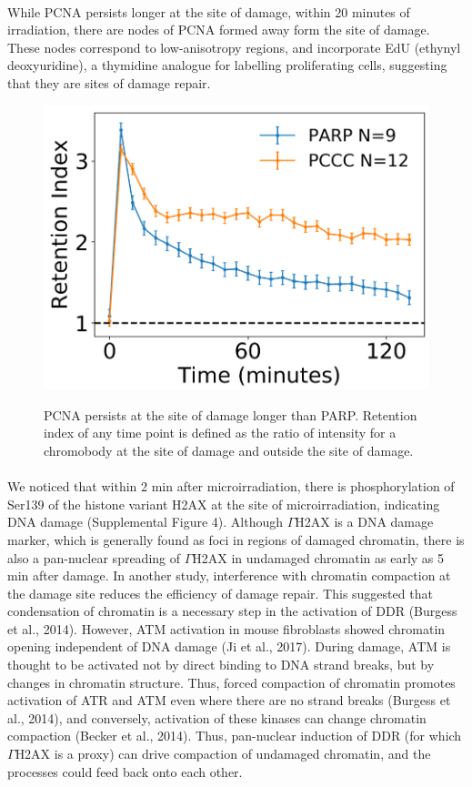 \paragraph*{} While PCNA persists longer at the site of damage, within 20 minutes of irradiation, there are nodes of PCNA formed away form the site of damage. These nodes correspond to low-anisotropy regions, and incorporate EdU (ethynyl deoxyuridine), a thymidine analogue for labelling proliferating cells, suggesting that they are sites of damage repair.

\begin{figure}[H]
    {\hfill\includegraphics[clip, width=0.5\linewidth]{figures/retention.png}\hspace*{\fill}}
    \caption{PCNA persists at the site of damage longer than PARP. Retention index of any time point is defined as the ratio of intensity for a chromobody at the site of damage and outside the site of damage.}
    {\label{fig:retention}}
\end{figure}

\paragraph*{} We noticed that within 2 min after microirradiation, there is phosphorylation of Ser139 of the histone variant H2AX at the site of microirradiation, indicating DNA damage (Supplemental Figure 4). Although $\Gamma$H2AX is a DNA damage marker, which is generally found as foci in regions of damaged chromatin, there is also a pan-nuclear spreading of $\Gamma$H2AX in undamaged chromatin as early as 5 min after damage. In another study, interference with chromatin compaction at the damage site reduces the efficiency of damage repair. This suggested that condensation of chromatin is a necessary step in the activation of DDR (Burgess et al., 2014). However, ATM activation in mouse fibroblasts showed chromatin opening independent of DNA damage (Ji et al., 2017). During damage, ATM is thought to be activated not by direct binding to DNA strand breaks, but by changes in chromatin structure. Thus, forced compaction of chromatin promotes activation of ATR and ATM even where there are no strand breaks (Burgess et al., 2014), and conversely, activation of these kinases can change chromatin compaction (Becker et al., 2014). Thus, pan-nuclear induction of DDR (for which $\Gamma$H2AX is a proxy) can drive compaction of undamaged chromatin, and the processes could feed back onto each other.

